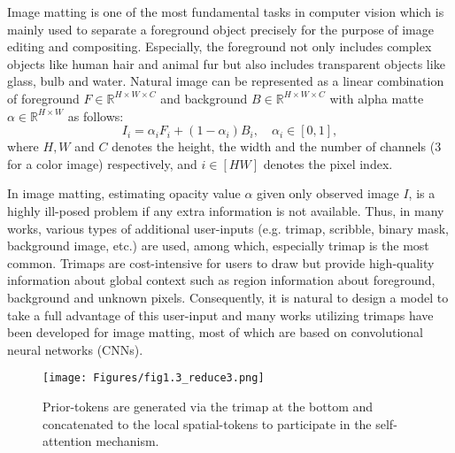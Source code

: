 \documentclass[10pt,twocolumn,letterpaper]{article}
\begin{document}
Image matting is one of the most fundamental tasks in computer vision which is mainly used to separate a foreground object precisely for the purpose of image editing and compositing. 
Especially, the foreground not only includes complex objects like human hair and animal fur but also includes transparent objects like glass, bulb and water. Natural image can be represented as a linear combination of foreground $F \in \mathbb{R}^{H\times W \times C}$ and background $B \in \mathbb{R}^{H\times W \times C}$ with alpha matte $\alpha \in \mathbb{R}^{H\times W}$ as follows: 
\begin{equation}
  I_{i} = \alpha_{i}  F_{i} + (1-\alpha_{i}) B_{i}, \quad \alpha_{i} \in [0,1],
  \label{eq:matting}
\end{equation}
where $H, W$ and $C$ denotes the height, the width and the number of channels (3 for a color image) respectively, and $i \in [HW]$ denotes the pixel index. 

In image matting, estimating opacity value $\alpha$ given only observed image $I$, is a highly ill-posed problem if any extra information is not available. Thus, in many works, various types of additional user-inputs (e.g. trimap, scribble, binary mask, background image, etc.) are used, among which, especially trimap is the most common. Trimaps are cost-intensive for users to draw but provide high-quality information about global context such as region information about foreground, background and unknown pixels. Consequently, it is natural to design a model to take a full advantage of this user-input and many works utilizing trimaps have been developed for image matting, most of which are based on convolutional neural networks (CNNs).

\begin{figure}
  \begin{center}
  \texttt{[image: Figures/fig1.3\_reduce3.png]}
  \end{center}
  \vspace{-5mm}
  \caption{Prior-tokens are generated via the trimap at the bottom and concatenated to the local spatial-tokens to participate in the self-attention mechanism.}
  \label{fig:intro}
\end{figure} 
\end{document}
